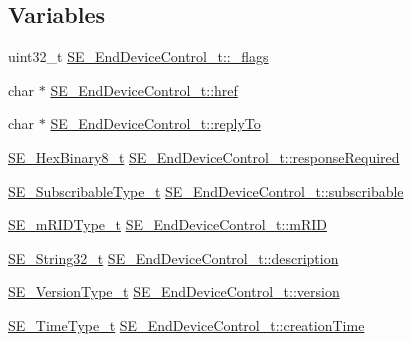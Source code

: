 \subsection*{Variables}
\begin{DoxyCompactItemize}
\item 
uint32\+\_\+t \hyperlink{group__EndDeviceControl_gac4952ef023e53ea6f68563ea53149671}{S\+E\+\_\+\+End\+Device\+Control\+\_\+t\+::\+\_\+flags}
\item 
char $\ast$ \hyperlink{group__EndDeviceControl_gaae75efbe6c13cc0e8e0217103f629b44}{S\+E\+\_\+\+End\+Device\+Control\+\_\+t\+::href}
\item 
char $\ast$ \hyperlink{group__EndDeviceControl_ga5098e3ee0cbe07d0bb9821563911c00c}{S\+E\+\_\+\+End\+Device\+Control\+\_\+t\+::reply\+To}
\item 
\hyperlink{group__HexBinary8_gaecf2dab3615fb954a693c017a61f77d6}{S\+E\+\_\+\+Hex\+Binary8\+\_\+t} \hyperlink{group__EndDeviceControl_ga8bcd48a58db8fc4838ca0fa46fbfb5f6}{S\+E\+\_\+\+End\+Device\+Control\+\_\+t\+::response\+Required}
\item 
\hyperlink{group__SubscribableType_ga5c41f553d369710ed34619266bf2551e}{S\+E\+\_\+\+Subscribable\+Type\+\_\+t} \hyperlink{group__EndDeviceControl_gaa9263c27137bebba854f6e4a0bebdd51}{S\+E\+\_\+\+End\+Device\+Control\+\_\+t\+::subscribable}
\item 
\hyperlink{group__mRIDType_gac74622112f3a388a2851b2289963ba5e}{S\+E\+\_\+m\+R\+I\+D\+Type\+\_\+t} \hyperlink{group__EndDeviceControl_ga2d9078ee1ddd1569a54b6522d3d92777}{S\+E\+\_\+\+End\+Device\+Control\+\_\+t\+::m\+R\+ID}
\item 
\hyperlink{group__String32_gac9f59b06b168b4d2e0d45ed41699af42}{S\+E\+\_\+\+String32\+\_\+t} \hyperlink{group__EndDeviceControl_ga545de4dad199d065df2673eaa0160606}{S\+E\+\_\+\+End\+Device\+Control\+\_\+t\+::description}
\item 
\hyperlink{group__VersionType_ga4b8d27838226948397ed99f67d46e2ae}{S\+E\+\_\+\+Version\+Type\+\_\+t} \hyperlink{group__EndDeviceControl_gaf064d7556402ba5286fe5ced5ce2a4f4}{S\+E\+\_\+\+End\+Device\+Control\+\_\+t\+::version}
\item 
\hyperlink{group__TimeType_ga6fba87a5b57829b4ff3f0e7638156682}{S\+E\+\_\+\+Time\+Type\+\_\+t} \hyperlink{group__EndDeviceControl_gaa9ee3d8e5ffcd87c3f77dd32d5ebc277}{S\+E\+\_\+\+End\+Device\+Control\+\_\+t\+::creation\+Time}
\item 
\mbox{\label{group__EndDeviceControl_gaca51e85015bfa7694a5a444945c0cee3}} 

\end{DoxyCompactItemize}
